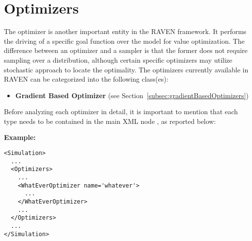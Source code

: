 \section{Optimizers}
\label{sec:Optimizers}

\renewcommand{\nameDescription}
{
  \xmlAttr{name},
  \xmlDesc{required string attribute}, user-defined name of this optimizer.
  \nb As with other objects, this identifier can be used to reference this
  specific entity from other input blocks in the XML.
}
\renewcommand{\specBlock}[2]
{
  The specifications of this optimizer must be defined within #1 \xmlNode{#2} XML
  block.
}


The optimizer is another important entity in the RAVEN framework. It performs the driving of a specific goal function 
over the model for value optimization. The difference between an optimizer and a sampler is that the former does not require
 sampling over a distribution, although certain specific optimizers may utilize stochastic approach to locate the optimality.
The optimizers currently available in RAVEN can be categorized into the following class(es):
\begin{itemize}
\item \textbf{Gradient Based Optimizer} (see Section~\ref{subsec:gradientBasedOptimizers})
\end{itemize}

Before analyzing each optimizer in detail, it is important to mention that each type needs to be contained in the main XML 
node , as reported below:

\textbf{Example:}

\begin{lstlisting}[style=XML]
<Simulation>
  ...
  <Optimizers>
    ...
    <WhatEverOptimizer name='whatever'>
      ...
    </WhatEverOptimizer>
    ...
  </Optimizers>
  ...
</Simulation>
\end{lstlisting}

